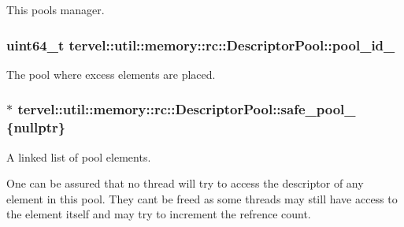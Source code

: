 This pool\textquotesingle{}s manager. 

\hypertarget{classtervel_1_1util_1_1memory_1_1rc_1_1_descriptor_pool_adec7cbd5e692812b0aa0afefa04697d7}{}
\subsubsection[{pool\+\_\+id\+\_\+}]{\setlength{\rightskip}{0pt plus 5cm}uint64\+\_\+t tervel\+::util\+::memory\+::rc\+::\+Descriptor\+Pool\+::pool\+\_\+id\+\_\+\hspace{0.3cm}{\ttfamily [private]}}\label{classtervel_1_1util_1_1memory_1_1rc_1_1_descriptor_pool_adec7cbd5e692812b0aa0afefa04697d7}


The pool where excess elements are placed. 

\hypertarget{classtervel_1_1util_1_1memory_1_1rc_1_1_descriptor_pool_a816f71722b9a18b007154e27bdb153bd}{}
\subsubsection[{safe\+\_\+pool\+\_\+}]{$\ast$ tervel\+::util\+::memory\+::rc\+::\+Descriptor\+Pool\+::safe\+\_\+pool\+\_\+ \{nullptr\}\hspace{0.3cm}{\ttfamily [private]}}\label{classtervel_1_1util_1_1memory_1_1rc_1_1_descriptor_pool_a816f71722b9a18b007154e27bdb153bd}


A linked list of pool elements. 

One can be assured that no thread will try to access the descriptor of any element in this pool. They can\textquotesingle{}t be freed as some threads may still have access to the element itself and may try to increment the refrence count. \hypertarget{classtervel_1_1util_1_1memory_1_1rc_1_1_descriptor_pool_a121f3c807724ee68f21faf5e659c2cf7}{}
